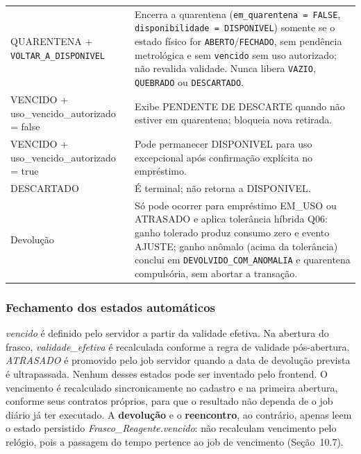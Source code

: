 \begin{longtable}{>{\raggedright\arraybackslash}p{} >{\raggedright\arraybackslash}p{}}
QUARENTENA + \texttt{VOLTAR\_A\_DISPONIVEL} & Encerra a quarentena (\texttt{em\_quarentena = FALSE}, \texttt{disponibilidade = DISPONIVEL}) somente se o estado físico for \texttt{ABERTO}/\texttt{FECHADO}, sem pendência metrológica e sem \texttt{vencido} sem uso autorizado; não revalida validade. Nunca libera \texttt{VAZIO}, \texttt{QUEBRADO} ou \texttt{DESCARTADO}.\\
VENCIDO + uso\_vencido\_autorizado = false & Exibe PENDENTE DE DESCARTE quando não estiver em quarentena; bloqueia nova retirada.\\
VENCIDO + uso\_vencido\_autorizado = true & Pode permanecer DISPONIVEL para uso excepcional após confirmação explícita no empréstimo.\\
DESCARTADO & É terminal; não retorna a DISPONIVEL.\\
Devolução & Só pode ocorrer para empréstimo EM\_USO ou ATRASADO e aplica tolerância híbrida Q06: ganho tolerado produz consumo zero e evento AJUSTE; ganho anômalo (acima da tolerância) conclui em \texttt{DEVOLVIDO\_COM\_ANOMALIA} e quarentena compulsória, sem abortar a transação.\\
\bottomrule
\end{longtable}

\subsubsection{Fechamento dos estados automáticos}
\textit{vencido} é definido pelo servidor a partir da validade efetiva. Na abertura do frasco, \textit{validade\_efetiva} é recalculada conforme a regra de validade pós-abertura. \textit{ATRASADO} é promovido pelo job servidor quando a data de devolução prevista é ultrapassada. Nenhum desses estados pode ser inventado pelo frontend. O vencimento é recalculado sincronicamente no cadastro e na primeira abertura, conforme seus contratos próprios, para que o resultado não dependa de o job diário já ter executado. A \textbf{devolução} e o \textbf{reencontro}, ao contrário, apenas leem o estado persistido \textit{Frasco\_Reagente.vencido}: não recalculam vencimento pelo relógio, pois a passagem do tempo pertence ao job de vencimento (Seção~10.7).

